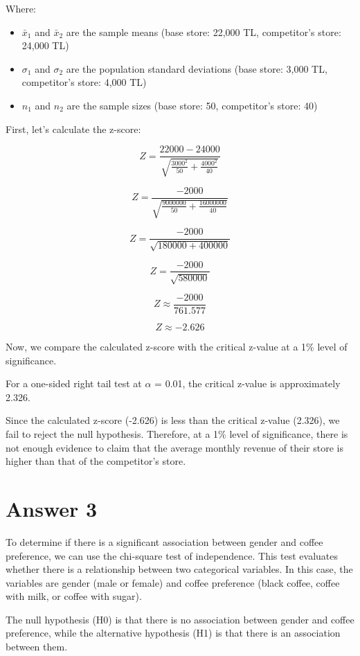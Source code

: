 \documentclass[12pt]{article}
\begin{document}
Where:
\begin{itemize}
    \item $\bar{x}_1$ and $\bar{x}_2$ are the sample means (base store: 22,000 TL, competitor's store: 24,000 TL)
    \item $\sigma_1$ and $\sigma_2$ are the population standard deviations (base store: 3,000 TL, competitor's store: 4,000 TL)
    \item $n_1$ and $n_2$ are the sample sizes (base store: 50, competitor's store: 40)
\end{itemize}


First, let's calculate the z-score:

\[ Z = \frac{22000 - 24000}{\sqrt{\frac{3000^2}{50} + \frac{4000^2}{40}}} \]

\[ Z = \frac{-2000}{\sqrt{\frac{9000000}{50} + \frac{16000000}{40}}} \]

\[ Z = \frac{-2000}{\sqrt{180000 + 400000}} \]

\[ Z = \frac{-2000}{\sqrt{580000}} \]

\[ Z \approx \frac{-2000}{761.577} \]

\[ Z \approx -2.626 \]

Now, we compare the calculated z-score with the critical z-value at a 1\% level of significance.

For a one-sided right tail test at $\alpha$ = 0.01, the critical z-value is approximately 2.326.

Since the calculated z-score (-2.626) is less than the critical z-value (2.326), we fail to reject the null hypothesis. Therefore, at a 1\% level of significance, there is not enough evidence to claim that the average monthly revenue of their store is higher than that of the competitor's store.

\section*{Answer 3}


To determine if there is a significant association between gender and coffee preference, we can use the chi-square test of independence. This test evaluates whether there is a relationship between two categorical variables. In this case, the variables are gender (male or female) and coffee preference (black coffee, coffee with milk, or coffee with sugar).

The null hypothesis (H0) is that there is no association between gender and coffee preference, while the alternative hypothesis (H1) is that there is an association between them.
\end{document}
